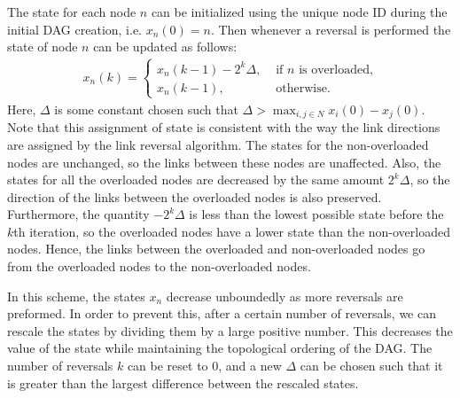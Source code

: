 \documentclass{sig-alternate-2013}
\begin{document}
The state for each node $n$ can be initialized using the unique node ID during the initial DAG creation, i.e. $x_n(0) = n$. Then whenever a reversal is performed the state of node $n$ can be updated as follows: 
\begin{align*}
x_n(k) =\left\{
\begin{array}{ll}
 x_n(k-1) - 2^k\Delta, & \text{ if $n$ is overloaded,}\\
x_n(k-1), & \text{ otherwise.}
\end{array}
\right.
\end{align*}
Here, $\Delta$ is some constant chosen such that $\Delta > \max_{i,j \in N} x_i(0) - x_j(0)$. Note that this assignment of state is consistent with the way the link directions are assigned by the link reversal algorithm. The states for the non-overloaded nodes are unchanged, so the links between these nodes are unaffected. Also, the states for all the overloaded nodes are decreased by the same amount $2^k\Delta$, so the direction of the links between the overloaded nodes is also preserved. Furthermore, the quantity $-2^k\Delta$ is less than the lowest possible state before the $k$th iteration, so the overloaded nodes have a lower state than the non-overloaded nodes. Hence, the links between the overloaded and non-overloaded nodes go from the overloaded nodes to the non-overloaded nodes. 

In this scheme, the states $x_n$ decrease unboundedly as more reversals are preformed. In order to prevent this, after a certain number of reversals, we can rescale the states by dividing them by a large positive number. This decreases the value of the state while maintaining the topological ordering of the DAG. The number of reversals $k$ can be reset to 0, and a new $\Delta$ can be chosen such that it is greater than the largest difference between the rescaled states.
\end{document}
